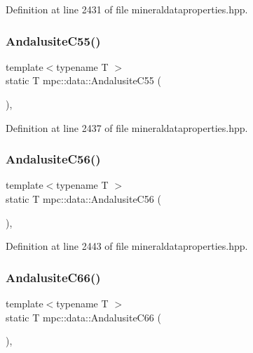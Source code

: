 Definition at line 2431 of file mineraldataproperties.\+hpp.

\mbox{\label{namespacempc_1_1data_a68fbbac6775da77122774a27db2b44fe}} 
\subsubsection{\texorpdfstring{Andalusite\+C55()}{AndalusiteC55()}}
{\footnotesize\ttfamily template$<$typename T $>$ \\
static T mpc\+::data\+::\+Andalusite\+C55 (\begin{DoxyParamCaption}{ }\end{DoxyParamCaption})\hspace{0.3cm}{\ttfamily [inline]}, {\ttfamily [static]}}



Definition at line 2437 of file mineraldataproperties.\+hpp.

\mbox{\label{namespacempc_1_1data_ac9ee242c4ed6f414f2c6f632fcb662b2}} 
\subsubsection{\texorpdfstring{Andalusite\+C56()}{AndalusiteC56()}}
{\footnotesize\ttfamily template$<$typename T $>$ \\
static T mpc\+::data\+::\+Andalusite\+C56 (\begin{DoxyParamCaption}{ }\end{DoxyParamCaption})\hspace{0.3cm}{\ttfamily [inline]}, {\ttfamily [static]}}



Definition at line 2443 of file mineraldataproperties.\+hpp.

\mbox{\label{namespacempc_1_1data_a15f0814bc43a27d1a0577de251ae7ba8}} 
\subsubsection{\texorpdfstring{Andalusite\+C66()}{AndalusiteC66()}}
{\footnotesize\ttfamily template$<$typename T $>$ \\
static T mpc\+::data\+::\+Andalusite\+C66 (\begin{DoxyParamCaption}{ }\end{DoxyParamCaption})\hspace{0.3cm}{\ttfamily [inline]}, {\ttfamily [static]}}



